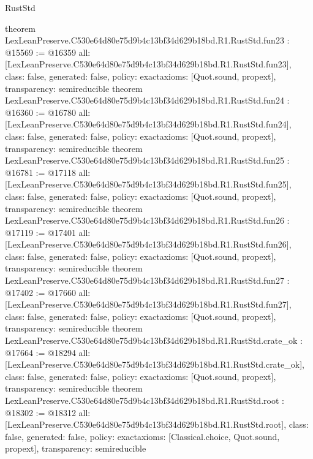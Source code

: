 \begin{lexlean}{RustStd}
\begin{coremodule}
{}
theorem LexLeanPreserve.C530e64d80e75d9b4c13bf34d629b18bd.R1.RustStd.fun23 : @15569 := @16359 {
  all: [LexLeanPreserve.C530e64d80e75d9b4c13bf34d629b18bd.R1.RustStd.fun23],
  class: false,
  generated: false,
  policy: exact{axioms: [Quot.sound, propext]},
  transparency: semireducible
}
theorem LexLeanPreserve.C530e64d80e75d9b4c13bf34d629b18bd.R1.RustStd.fun24 : @16360 := @16780 {
  all: [LexLeanPreserve.C530e64d80e75d9b4c13bf34d629b18bd.R1.RustStd.fun24],
  class: false,
  generated: false,
  policy: exact{axioms: [Quot.sound, propext]},
  transparency: semireducible
}
theorem LexLeanPreserve.C530e64d80e75d9b4c13bf34d629b18bd.R1.RustStd.fun25 : @16781 := @17118 {
  all: [LexLeanPreserve.C530e64d80e75d9b4c13bf34d629b18bd.R1.RustStd.fun25],
  class: false,
  generated: false,
  policy: exact{axioms: [Quot.sound, propext]},
  transparency: semireducible
}
theorem LexLeanPreserve.C530e64d80e75d9b4c13bf34d629b18bd.R1.RustStd.fun26 : @17119 := @17401 {
  all: [LexLeanPreserve.C530e64d80e75d9b4c13bf34d629b18bd.R1.RustStd.fun26],
  class: false,
  generated: false,
  policy: exact{axioms: [Quot.sound, propext]},
  transparency: semireducible
}
theorem LexLeanPreserve.C530e64d80e75d9b4c13bf34d629b18bd.R1.RustStd.fun27 : @17402 := @17660 {
  all: [LexLeanPreserve.C530e64d80e75d9b4c13bf34d629b18bd.R1.RustStd.fun27],
  class: false,
  generated: false,
  policy: exact{axioms: [Quot.sound, propext]},
  transparency: semireducible
}
theorem LexLeanPreserve.C530e64d80e75d9b4c13bf34d629b18bd.R1.RustStd.crate_ok : @17664 := @18294 {
  all: [LexLeanPreserve.C530e64d80e75d9b4c13bf34d629b18bd.R1.RustStd.crate_ok],
  class: false,
  generated: false,
  policy: exact{axioms: [Quot.sound, propext]},
  transparency: semireducible
}
theorem LexLeanPreserve.C530e64d80e75d9b4c13bf34d629b18bd.R1.RustStd.root : @18302 := @18312 {
  all: [LexLeanPreserve.C530e64d80e75d9b4c13bf34d629b18bd.R1.RustStd.root],
  class: false,
  generated: false,
  policy: exact{axioms: [Classical.choice, Quot.sound, propext]},
  transparency: semireducible
}


\end{coremodule}
\end{lexlean}
